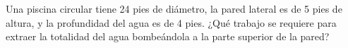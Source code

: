 \item Una piscina circular tiene 24 pies de diámetro, la pared lateral es de 5 pies de altura, y la profundidad del agua es de 4 pies. ¿Qué trabajo se requiere para extraer la totalidad del agua bombeándola a la parte superior de la pared?
